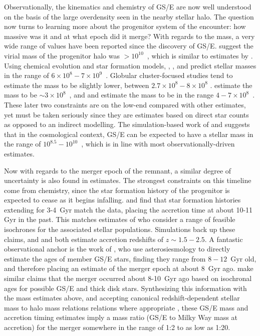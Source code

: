 Observationally, the kinematics and chemistry of GS/E are now well understood on the basis of the large overdensity seen in the nearby stellar halo. The question now turns to learning more about the progenitor system of the encounter: how massive was it and at what epoch did it merge? With regards to the mass, a very wide range of values have been reported since the discovery of GS/E. \textcite{belokurov18} suggest the virial mass of the progenitor halo was $> 10^{10}$~\Msun, which is similar to estimates by \textcite{das20}. Using chemical evolution and star formation models, \textcite{helmi18}, \textcite{vincenzo19}, and \textcite{feuillet20} predict stellar masses in the range of $6\times10^{8} - 7\times10^{9}$~\Msun. Globular cluster-focused studies tend to estimate the mass to be slightly lower, between $2.7\times10^{8}-8\times10^{8}$ \parencite{kruijssen20,forbes20}. \textcite{mackereth20} estimate the mass to be $\sim 3\times10^{8}$~\Msun, and \textcite{naidu20} and \textcite{naidu21} estimate the mass to be in the range $4-7\times10^{8}$~\Msun. These later two constraints are on the low-end compared with other estimates, yet must be taken seriously since they are estimates based on direct star counts as opposed to an indirect modelling. The simulation-based work of \textcite{fattahi19} and \textcite{mackereth19a} suggests that in the cosmological context, GS/E can be expected to have a stellar mass in the range of $10^{8.5}-10^{10}$~\Msun, which is in line with most observationally-driven estimates.

Now with regards to the merger epoch of the remnant, a similar degree of uncertainty is also found in estimates. The strongest constraints on this timeline come from chemistry, since the star formation history of the progenitor is expected to cease as it begins infalling. \textcite{vincenzo19} and \textcite{sanders21} find that star formation histories extending for 3-4~Gyr match the data, placing the accretion time at about 10-11 Gyr in the past. This matches estimates of \textcite{helmi18} who consider a range of feasible isochrones for the associated stellar populations. Simulations back up these claims, and \textcite{fattahi19} and \textcite{mackereth19a} both estimate accretion redshifts of $z \sim 1.5-2.5$. A fantastic observational anchor is the work of \textcite{montalban21}, who use asterosiesmology to directly estimate the ages of member GS/E stars, finding they range from $8-12$~Gyr old, and therefore placing an estimate of the merger epoch at about 8~Gyr ago. \textcite{gallart19} make similar claims that the merger occurred about 8-10~Gyr ago based on isochronal ages for possible GS/E and thick disk stars. Synthesizing this information with the mass estimates above, and accepting canonical redshift-dependent stellar mass to halo mass relations relations where appropriate \parencite[e.g.][]{read17}, these GS/E mass and accretion timing estimates imply a mass ratio (GS/E to Milky Way mass at accretion) for the merger somewhere in the range of 1:2 to as low as 1:20.

